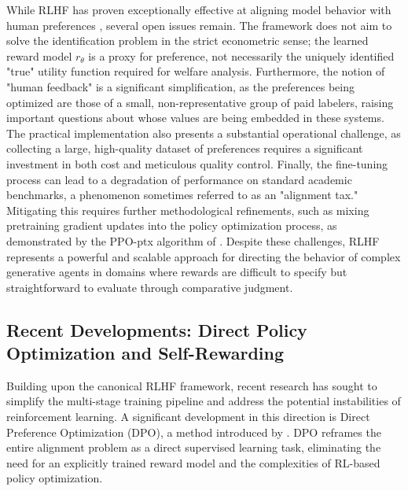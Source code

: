 While RLHF has proven exceptionally effective at aligning model behavior with human preferences \citep{stiennon2020learning}, several open issues remain. The framework does not aim to solve the identification problem in the strict econometric sense; the learned reward model $r_\theta$ is a proxy for preference, not necessarily the uniquely identified "true" utility function required for welfare analysis. Furthermore, the notion of "human feedback" is a significant simplification, as the preferences being optimized are those of a small, non-representative group of paid labelers, raising important questions about whose values are being embedded in these systems. The practical implementation also presents a substantial operational challenge, as collecting a large, high-quality dataset of preferences requires a significant investment in both cost and meticulous quality control. Finally, the fine-tuning process can lead to a degradation of performance on standard academic benchmarks, a phenomenon sometimes referred to as an "alignment tax." Mitigating this requires further methodological refinements, such as mixing pretraining gradient updates into the policy optimization process, as demonstrated by the PPO-ptx algorithm of \citet{ouyang2022training}. Despite these challenges, RLHF represents a powerful and scalable approach for directing the behavior of complex generative agents in domains where rewards are difficult to specify but straightforward to evaluate through comparative judgment.

\subsection{Recent Developments: Direct Policy Optimization and Self-Rewarding}

Building upon the canonical RLHF framework, recent research has sought to simplify the multi-stage training pipeline and address the potential instabilities of reinforcement learning. A significant development in this direction is Direct Preference Optimization (DPO), a method introduced by \citet{rafailov2023direct}. DPO reframes the entire alignment problem as a direct supervised learning task, eliminating the need for an explicitly trained reward model and the complexities of RL-based policy optimization.

